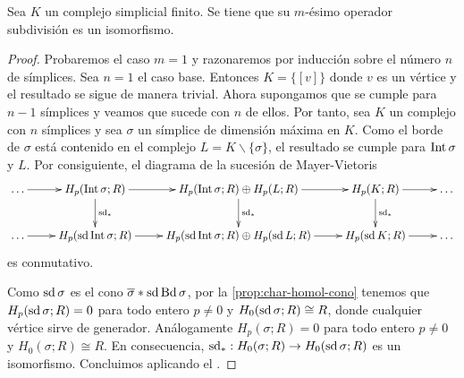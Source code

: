 \begin{proposicion}
	Sea $K$ un complejo simplicial finito. Se tiene que su $m$-ésimo operador subdivisión es un isomorfismo.
\end{proposicion}
\begin{proof}
	Probaremos el caso $m=1$ y razonaremos por inducción sobre el número $n$ de símplices. Sea $n=1$ el caso base. Entonces $K = \{[v]\}$ donde $v$ es un vértice y el resultado se sigue de manera trivial. Ahora supongamos que se cumple para $n-1$ símplices y veamos que sucede con $n$ de ellos. Por tanto, sea $K$ un complejo con $n$ símplices y sea $\sigma$ un símplice de dimensión máxima en $K$. Como el borde de $\sigma$ está contenido en el complejo $L = K \backslash \{\sigma\}$, el resultado se cumple para $\operatorname{Int} \sigma$ y $L$. Por consiguiente, el diagrama de la sucesión de Mayer-Vietoris
	\[
		\xymatrix{
			\dots \ar@{->}[r] & H_p(\interior \sigma;R) \ar@{->}[r] \ar@{->}[d]^{\sd_*} & H_p(\interior \sigma;R) \oplus H_p(L;R) \ar@{->}[d]^{\sd_*} \ar@{->}[r] & H_p(K;R) \ar@{->}[r] \ar@{->}[d]^{\sd_*} & \dots \\
			\dots \ar@{->}[r] & H_p(\sd \interior \sigma;R) \ar@{->}[r] & H_p(\sd \interior \sigma;R) \oplus H_p(\sd L;R) \ar@{->}[r] & H_p(\sd K;R) \ar@{->}[r] & \dots
		}
	\]
	es conmutativo.

	Como $\operatorname{sd} \sigma$ es el cono $\overline{\sigma} \ast \operatorname{sd} \operatorname{Bd} \sigma$, por la \autoref{prop:char-homol-cono} tenemos que $H_p(\operatorname{sd} \sigma;R) = 0$ para todo entero $p \neq 0$ y $H_0(\operatorname{sd} \sigma;R) \cong R$, donde cualquier vértice sirve de generador. Análogamente $H_p(\sigma;R) = 0$ para todo entero $p \neq 0$ y $H_0(\sigma;R) \cong R$. En consecuencia, $\operatorname{sd}_* : H_0(\sigma;R) \to H_0(\operatorname{sd} \sigma;R)$ es un isomorfismo. Concluimos aplicando el .
\end{proof}

